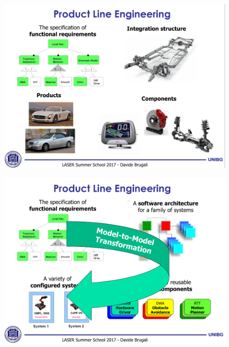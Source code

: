 \documentclass[xetex,mathserif,serif]{beamer}
\begin{document}
	\begin{frame}
		\begin{center}
			\includegraphics[width=0.9\textwidth]{brugali4.png}
		\end{center}
	\end{frame}

	\begin{frame}
		\begin{center}
			\includegraphics[width=0.9\textwidth]{brugali5.png}
		\end{center}
	\end{frame}
\end{document}
